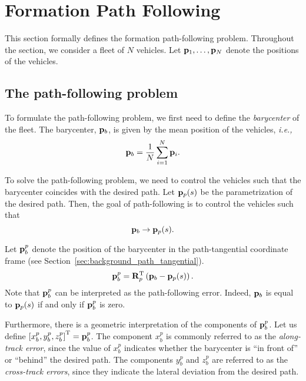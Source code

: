 \section{Formation Path Following}
\label{sec:background_formation_path_following}

This section formally defines the formation path-following problem.
Throughout the section, we consider a fleet of $N$ vehicles.
Let $\mathbf{p}_1, \ldots, \mathbf{p}_N$ denote the positions of the vehicles.

\subsection{The path-following problem}
To formulate the path-following problem, we first need to define the \emph{barycenter} of the fleet.
The barycenter, $\mathbf{p}_b$, is given by the mean position of the vehicles, \emph{i.e.,}
\begin{equation}
    \mathbf{p}_b = \frac{1}{N} \sum_{i=1}^N \mathbf{p}_i.
    \label{eq:background_p_b}
\end{equation}

To solve the path-following problem, we need to control the vehicles such that the barycenter coincides with the desired path.
Let $\mathbf{p}_p(s)$ be the parametrization of the desired path.
Then, the goal of path-following is to control the vehicles such that
\begin{equation}
    \mathbf{p}_b \rightarrow \mathbf{p}_p(s).
\end{equation}

Let $\mathbf{p}_b^p$ denote the position of the barycenter in the path-tangential coordinate frame (see Section~\ref{sec:background_path_tangential}).
\begin{equation}
    \mathbf{p}_b^p = \mathbf{R}_p^{\mathrm{T}} \left(\mathbf{p}_b - \mathbf{p}_p(s)\right).
\end{equation}
Note that $\mathbf{p}_b^p$ can be interpreted as the path-following error.
Indeed, $\mathbf{p}_b$ is equal to $\mathbf{p}_p(s)$ if and only if $\mathbf{p}_b^p$ is zero.

Furthermore, there is a geometric interpretation of the components of $\mathbf{p}_b^p$.
Let us define $\left[x_b^p, y_b^p, z_b^p\right]^{\mathrm{T}} = \mathbf{p}_b^p$.
The component $x_b^p$ is commonly referred to as the \emph{along-track error}, since the value of $x_b^p$ indicates whether the barycenter is ``in front of'' or ``behind'' the desired path.
The components $y_b^p$ and $z_b^p$ are referred to as the \emph{cross-track errors}, since they indicate the lateral deviation from the desired path.

